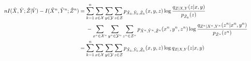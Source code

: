 \documentclass[journal]{IEEEtran}
\newcommand{\channelpmf}{q}
\newcommand{\codebookpmf}{p}
\newcommand{\channelInOne}{X}
\newcommand{\channelInOneAlph}{\mathcal{X}}
\newcommand{\channelInOneAlphElement}{x}
\newcommand{\channelInTwo}{Y}
\newcommand{\channelInTwoAlph}{\mathcal{Y}}
\newcommand{\channelInTwoAlphElement}{y}
\newcommand{\channelOut}{Z}
\newcommand{\channelOutAlph}{\mathcal{Z}}
\newcommand{\channelOutAlphElement}{z}
\newcommand{\codebookBlocklength}{n}
\newcommand{\blockIndex}{k}
\newcommand{\mutualInformation}[2]{I(#1;#2)}
\newcommand{\mutualInformationConditional}[3]{I(#1;#2|#3)}
\newcommand{\timeSharingRV}{V}
\begin{document}
\begin{align}
\label{converse-mutinf-bound-start}
\codebookBlocklength
\mutualInformationConditional{\hat{\channelInOne}, \hat{\channelInTwo}}{\hat{\channelOut}}{\hat{\timeSharingRV}}
-
\mutualInformation{\tilde{\channelInOne}^\codebookBlocklength, \tilde{\channelInTwo}^\codebookBlocklength}{\tilde{\channelOut}^\codebookBlocklength}
&=
\sum\limits_{\blockIndex=1}^{\codebookBlocklength}
\sum\limits_{\channelInOneAlphElement \in \channelInOneAlph}
\sum\limits_{\channelInTwoAlphElement \in \channelInTwoAlph}
\sum\limits_{\channelOutAlphElement \in \channelOutAlph}
  \codebookpmf_{\tilde{\channelInOne}_\blockIndex, \tilde{\channelInTwo}_\blockIndex, \tilde{\channelOut}_\blockIndex}(\channelInOneAlphElement, \channelInTwoAlphElement, \channelOutAlphElement)
  \log \frac{\channelpmf_{\channelOut | \channelInOne, \channelInTwo}(\channelOutAlphElement | \channelInOneAlphElement, \channelInTwoAlphElement)}
            {\codebookpmf_{\tilde{\channelOut}_\blockIndex}(\channelOutAlphElement)}
\nonumber
\\
&\hphantom{{}={}}
-
\sum\limits_{\channelInOneAlphElement^{\codebookBlocklength} \in \channelInOneAlph^{\codebookBlocklength}}
\sum\limits_{\channelInTwoAlphElement^{\codebookBlocklength} \in \channelInTwoAlph^{\codebookBlocklength}}
\sum\limits_{\channelOutAlphElement^{\codebookBlocklength} \in \channelOutAlph^{\codebookBlocklength}}
  \codebookpmf_{\tilde{\channelInOne}^{\codebookBlocklength}, \tilde{\channelInTwo}^{\codebookBlocklength}, \tilde{\channelOut}^{\codebookBlocklength}}(\channelInOneAlphElement^{\codebookBlocklength}, \channelInTwoAlphElement^{\codebookBlocklength}, \channelOutAlphElement^{\codebookBlocklength})
\log \frac{\channelpmf_{\channelOut^{\codebookBlocklength} | \channelInOne^{\codebookBlocklength}, \channelInTwo^{\codebookBlocklength}}(\channelOutAlphElement^{\codebookBlocklength} | \channelInOneAlphElement^{\codebookBlocklength}, \channelInTwoAlphElement^{\codebookBlocklength})}
            {\codebookpmf_{\tilde{\channelOut}^{\codebookBlocklength}}(\channelOutAlphElement^{\codebookBlocklength})}
\\
&=
\sum\limits_{\blockIndex=1}^{\codebookBlocklength}
\sum\limits_{\channelInOneAlphElement \in \channelInOneAlph}
\sum\limits_{\channelInTwoAlphElement \in \channelInTwoAlph}
\sum\limits_{\channelOutAlphElement \in \channelOutAlph}
  \codebookpmf_{\tilde{\channelInOne}_\blockIndex, \tilde{\channelInTwo}_\blockIndex, \tilde{\channelOut}_\blockIndex}(\channelInOneAlphElement, \channelInTwoAlphElement, \channelOutAlphElement)
  \log \channelpmf_{\channelOut | \channelInOne, \channelInTwo}(\channelOutAlphElement | \channelInOneAlphElement, \channelInTwoAlphElement)

\end{align}
\end{document}
